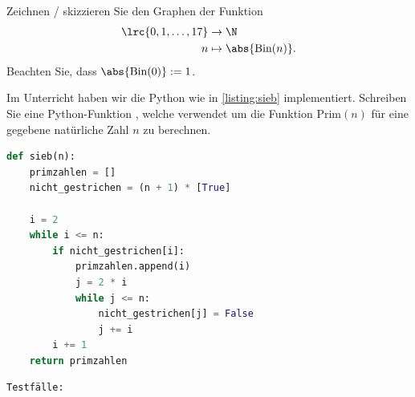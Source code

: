 \begin{questions}
	\question[2]
	Zeichnen / skizzieren Sie den Graphen der Funktion
	\begin{align*}
		\lrc{0, 1, \ldots, 17} & \to\N                       \\
		n                      & \mapsto\abs{\text{Bin}(n)}.
	\end{align*}
	Beachten Sie, dass $\abs{\text{Bin}(0)} := 1$.

	\begin{solution}
		\begin{figure}[H]
		\end{figure}
	\end{solution}


	\question[2] Im Unterricht haben wir die Python  wie in \cref{listing:sieb} implementiert.
	Schreiben Sie eine Python-Funktion , welche  verwendet um die Funktion $\text{Prim}(n)$ für eine gegebene natürliche Zahl $n$ zu berechnen.

	\begin{lstlisting}[language=Python,caption=Sieb des Eratosthenes,numbers=none,label=listing:sieb]
def sieb(n):
    primzahlen = []
    nicht_gestrichen = (n + 1) * [True]

    i = 2
    while i <= n:
        if nicht_gestrichen[i]:
            primzahlen.append(i)
            j = 2 * i
            while j <= n:
                nicht_gestrichen[j] = False
                j += i
        i += 1
    return primzahlen
\end{lstlisting}

	\begin{lstlisting}[numbers=none]
  Testfälle:


\end{lstlisting}
\end{questions}
